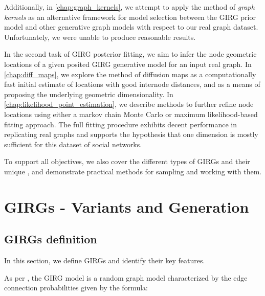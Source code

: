 Additionally, in \cref{chap:graph_kernels}, we attempt to apply the method of \textit{graph kernels} as an alternative framework for model selection between the GIRG prior model and other generative graph models with respect to our real graph dataset. Unfortunately, we were unable to produce reasonable results.



In the second task of GIRG posterior fitting, we aim to infer the node geometric locations of a given posited GIRG generative model for an input real graph. In \cref{chap:diff_maps}, we explore the method of diffusion maps as a computationally fast initial estimate of locations with good internode distances, and as a means of proposing the underlying geometric dimensionality. In \cref{chap:likelihood_point_estimation}, we describe methods to further refine node locations using either a markov chain Monte Carlo or maximum likelihood-based fitting approach. The full fitting procedure exhibits decent performance in replicating real graphs and supports the hypothesis that one dimension is mostly sufficient for this dataset of social networks.

To support all objectives, we also cover the different types of GIRGs and their unique , and demonstrate practical methods for sampling and working with them.



\chapter{GIRGs - Variants and Generation}
\minitoc
\section{GIRGs definition}
\label{sec:GIRG_def}
In this section, we define GIRGs and identify their key features.

As per \cite{bringmann2019geometric}, the GIRG model is a random graph model characterized by the edge connection probabilities given by the formula:

